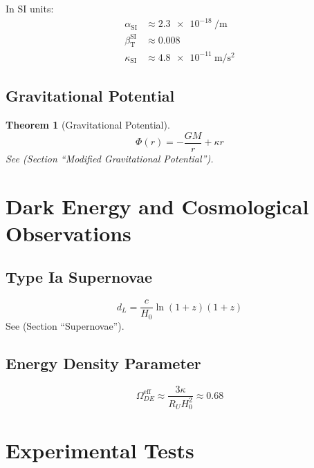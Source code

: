 \documentclass[a4paper,12pt]{article}
\newtheorem{theorem}{Theorem}[section]
\theoremstyle{definition}
\theoremstyle{remark}
\newcommand{\betaT}{\beta_{\text{T}}}
\begin{document}
	In SI units:
	\begin{align}
		\alpha_{\text{SI}} &\approx \SI{2.3e-18}{\per\meter} \\
		\betaT^{\text{SI}} &\approx 0.008 \\
		\kappa_{\text{SI}} &\approx \SI{4.8e-11}{\meter\per\second\squared}
	\end{align}
	
	\subsection{Gravitational Potential}
	
	\begin{theorem}[Gravitational Potential]
		\begin{equation}
			\Phi(r) = -\frac{G M}{r} + \kappa r
		\end{equation}
		See \cite{pascher_galaxies_2025} (Section “Modified Gravitational Potential”).
	\end{theorem}
	
	\section{Dark Energy and Cosmological Observations}
	
	\subsection{Type Ia Supernovae}
	
	\begin{equation}
		d_L = \frac{c}{H_0} \ln(1+z) (1+z)
	\end{equation}
	See \cite{pascher_messdifferenzen_2025} (Section “Supernovae”).
	
	\subsection{Energy Density Parameter}
	
	\begin{equation}
		\Omega_{DE}^{\text{eff}} \approx \frac{3 \kappa}{R_U H_0^2} \approx 0.68
	\end{equation}
	
	\section{Experimental Tests}
	
\end{document}
